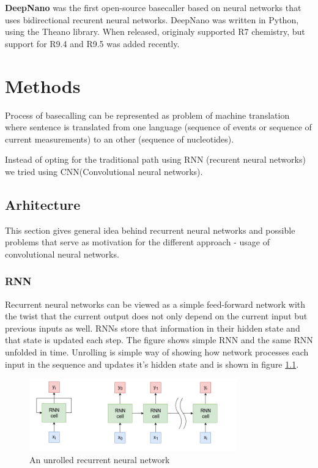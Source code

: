 \documentclass[times, utf8, diplomski, numeric, english]{fer}
\begin{document}
\textbf{DeepNano}\cite{Boza2017}  was the first open-source basecaller based on neural networks that uses bidirectional recurent neural networks. DeepNano was written in Python, using the Theano library. When released, originaly supported R7 chemistry, but support for R9.4 and R9.5 was added recently.

\chapter{Methods}
Process of basecalling can be represented as problem of machine translation where sentence is translated from one language (sequence of events or sequence of current measurements) to an other (sequence of nucleotides). 

Instead of opting for the traditional path using RNN (recurent neural networks)  we tried using CNN(Convolutional neural networks). 


\section{Arhitecture}
This section gives general idea behind recurrent neural networks and possible problems that serve as motivation for the different approach - usage of convolutional neural networks.

\subsection{RNN}
Recurrent neural networks can be viewed as a simple feed-forward network with the twist that the current output does not only depend on the current input but previous inputs as well. RNNs store that information in their hidden state and that state is updated each step. The figure shows simple RNN and the same RNN unfolded in time.  Unrolling is simple way of showing how network processes each input in the sequence and updates it's hidden state and is shown in figure  \ref{fg:rnn}. 
\begin{figure}[!ht]
	\begin{center}
		\includegraphics[width=0.8\textwidth]{./imgs/rnn.png}
		\caption{An unrolled recurrent neural network}
		\label{fg:rnn}
	\end{center}
\end{figure}
\end{document}
